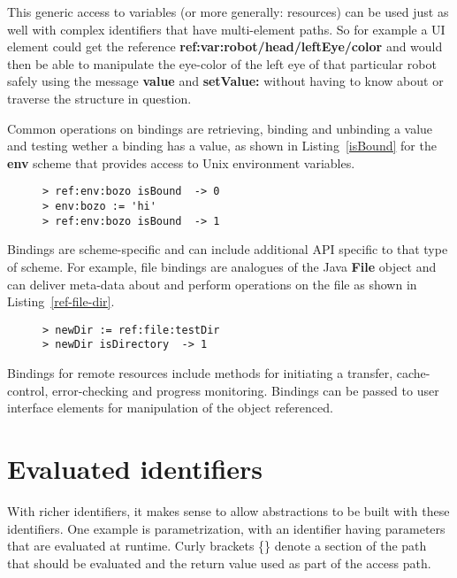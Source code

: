 \documentclass[preprint,authoryear]{acm_proc_article-sp}
\begin{document}
This generic access to variables (or more generally: resources) can be used just as well
with complex identifiers that have multi-element paths.  So for example a UI element
could get the reference {\bf ref:var:robot/head/leftEye/color} and would then be
able to manipulate the eye-color of the left eye of that particular robot safely using
the message {\bf value} and {\bf setValue:}
without having to know about or traverse the structure in question.

Common operations on bindings are retrieving, binding and unbinding a value and testing 
wether a binding has a value, as shown in Listing~\ref{isBound} for the {\bf env} scheme
that provides access to Unix environment variables.


\begin{figure}[htbp]
\begin{lstlisting}[style=L,label=isBound,caption=Is environment variable set?]
> ref:env:bozo isBound  -> 0
> env:bozo := 'hi'
> ref:env:bozo isBound  -> 1
\end{lstlisting}
\end{figure}

Bindings are scheme-specific and can include additional API specific to that type of scheme.
For example, file bindings are analogues of the Java {\bf File} object and can deliver
meta-data about and perform operations on the file as shown in Listing~\ref{ref-file-dir}.


\begin{figure}[htbp]
\begin{lstlisting}[style=L,label=ref-file-dir,caption=File and directory manipulation.]
> newDir := ref:file:testDir 
> newDir isDirectory  -> 1
\end{lstlisting}
\end{figure}

Bindings for remote resources include methods for initiating a transfer, cache-control,
error-checking and progress monitoring.   Bindings can be passed to user interface
elements for manipulation of the object referenced.




\section{Evaluated identifiers}

With richer identifiers, it makes sense to allow abstractions to be built with these identifiers.
One example is parametrization, with an identifier having parameters that are evaluated
at runtime.  Curly brackets \{\} denote a section of the path that should be evaluated and
the return value used as part of the access path.
\end{document}
